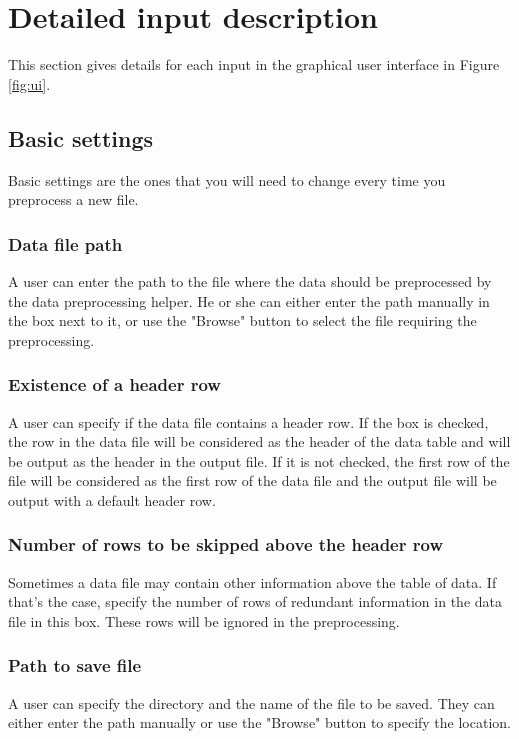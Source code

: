 \documentclass[12pt,a4paper]{article}
\begin{document}
\section{Detailed input description}
\label{sec:detailed_input}
This section gives details for each input in the graphical user interface in Figure \ref{fig:ui}.

\subsection{Basic settings}
Basic settings are the ones that you will need to change every time you preprocess a new file.

\subsubsection{Data file path}
A user can enter the path to the file where the data should be preprocessed by the data preprocessing helper.
He or she can either enter the path manually in the box next to it, or use the "Browse" button to select the file requiring the preprocessing.

\subsubsection{Existence of a header row}
A user can specify if the data file contains a header row.
If the box is checked, the row in the data file will be considered as the header of the data table and will be output as the header in the output file.
If it is not checked, the first row of the file will be considered as the first row of the data file and the output file will be output with a default header row.

\subsubsection{Number of rows to be skipped above the header row}
Sometimes a data file may contain other information above the table of data.
If that's the case, specify the number of rows of redundant information in the data file in this box.
These rows will be ignored in the preprocessing.

\subsubsection{Path to save file}
A user can specify the directory and the name of the file to be saved.
They can either enter the path manually or use the "Browse" button to specify the location.
\end{document}

